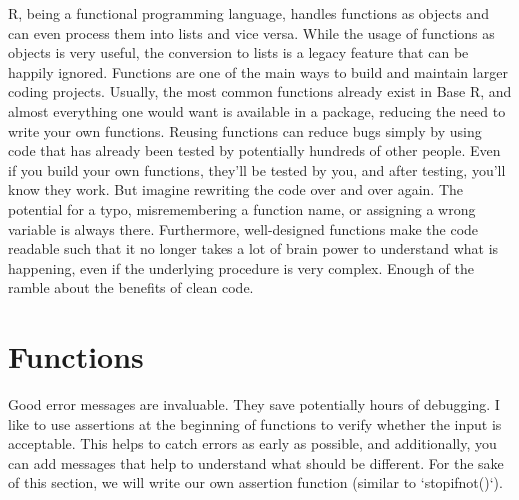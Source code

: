 \documentclass[twoside,twocolumn]{article}\usepackage[]{graphicx}\usepackage[dvipsnames]{xcolor}
\begin{document}
\label{sec:functions}
R, being a functional programming language, handles functions as objects and can even process them into lists and vice versa. While the usage of functions as objects is very useful, the conversion to lists is a legacy feature that can be happily ignored. Functions are one of the main ways to build and maintain larger coding projects. Usually, the most common functions already exist in Base R, and almost everything one would want is available in a package, reducing the need to write your own functions. Reusing functions can reduce bugs simply by using code that has already been tested by potentially hundreds of other people. Even if you build your own functions, they'll be tested by you, and after testing, you'll know they work. But imagine rewriting the code over and over again. The potential for a typo, misremembering a function name, or assigning a wrong variable is always there. Furthermore, well-designed functions make the code readable such that it no longer takes a lot of brain power to understand what is happening, even if the underlying procedure is very complex. Enough of the ramble about the benefits of clean code.

\section*{Functions}
Good error messages are invaluable. They save potentially hours of debugging. I like to use assertions at the beginning of functions to verify whether the input is acceptable. This helps to catch errors as early as possible, and additionally, you can add messages that help to understand what should be different. For the sake of this section, we will write our own assertion function (similar to `stopifnot()`).
\end{document}

